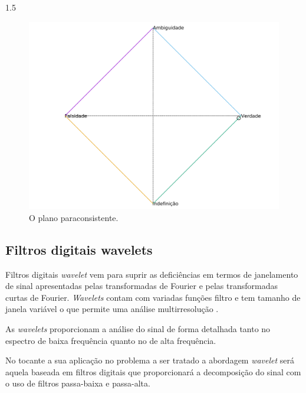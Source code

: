 \documentclass[a4paper,12pt,openright,oneside]{book}
\newenvironment{myenv}[1]
  {\begin{spacing}{#1}}
  {\end{spacing}}
\begin{document}
\begin{myenv}{1.5}
					\begin{figure}[h]
						\centering
						\includegraphics[width=0.7\linewidth]{images/paraconsistentPlane.pdf}
						\caption{O plano paraconsistente.}
						\label{fig:paraconsistentplane}
					\end{figure}

				\subsection{Filtros digitais  wavelets}
					\par Filtros digitais  \textit{wavelet} vem para suprir as deficiências em termos de janelamento de sinal apresentadas pelas transformadas de Fourier e pelas transformadas curtas de Fourier. \textit{Wavelets} contam com variadas funções filtro e tem tamanho de janela variável o que permite uma análise multirresolução \cite{Rod5254905}.
					\par As \textit{wavelets} proporcionam a análise do sinal de forma detalhada tanto no espectro de baixa frequência quanto no de alta frequência.
					\par No tocante a sua aplicação no problema a ser tratado a abordagem \textit{wavelet} será aquela baseada em filtros digitais que proporcionará a decomposição do sinal com o uso de filtros passa-baixa e passa-alta.
					

\end{myenv}
\end{document}
